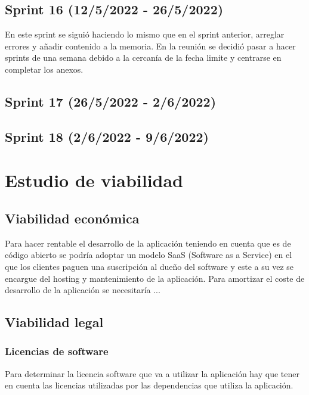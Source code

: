 \subsection{Sprint 16 (12/5/2022 - 26/5/2022)} 
	En este sprint se siguió haciendo lo mismo que en el sprint anterior, arreglar errores y añadir contenido a la memoria. En la reunión se decidió pasar a hacer sprints de una semana debido a la cercanía de la fecha limite y centrarse en completar los anexos.
\subsection{Sprint 17 (26/5/2022 - 2/6/2022)} 

\subsection{Sprint 18 (2/6/2022 - 9/6/2022)} 


\section{Estudio de viabilidad}

\subsection{Viabilidad económica}
Para hacer rentable el desarrollo de la aplicación teniendo en cuenta que es de código abierto se podría adoptar un modelo SaaS (Software as a Service) en el que los clientes paguen una suscripción al dueño del software y este a su vez se encargue del hosting y mantenimiento de la aplicación.
Para amortizar el coste de desarrollo de la aplicación se necesitaría ...
\subsection{Viabilidad legal}
\subsubsection{Licencias de software}
Para determinar la licencia software que va a utilizar la aplicación hay que tener en cuenta las licencias utilizadas por las dependencias que utiliza la aplicación.


